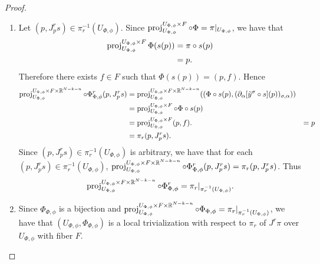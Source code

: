 \documentclass{book}
\begin{document}
\begin{proof}
\begin{enumerate}
		\item Let $(p, J_p^r s) \in \pi_r^{-1}(U_{\Phi, \phi})$. Since $\operatorname{\text{proj}}_{U_{\Phi, \phi}}^{U_{\Phi, \phi} \times F} \circ \Phi = \pi|_{U_{\Phi, \phi}}$, we have that 
		\begin{align*}
			\operatorname{\text{proj}}_{U_{\Phi, \phi}}^{U_{\Phi, \phi} \times F} \Phi(s(p))
			& = \pi \circ s(p) \\
			& = p.
		\end{align*}
		Therefore there exists $f \in F$ such that $\Phi(s(p)) = (p, f)$. Hence
		\begin{align*}
			\operatorname{\text{proj}}_{U_{\Phi, \phi}}^{U_{\Phi, \phi} \times F \times \mathbb{R}^{N-k-n}} \circ \Phi^r_{\Phi, \phi}(p, J_p^r s) 
			& = \operatorname{\text{proj}}_{U_{\Phi, \phi}}^{U_{\Phi, \phi} \times F \times \mathbb{R}^{N-k-n}}( (\Phi \circ s(p), (\partial_{\alpha}[\tilde{y}^{\sigma} \circ s](p))_{\sigma, \alpha})) \\
			& = \operatorname{\text{proj}}_{U_{\Phi, \phi}}^{U_{\Phi, \phi} \times F} \circ \Phi \circ s(p) \\
			& = \operatorname{\text{proj}}_{U_{\Phi, \phi}}^{U_{\Phi, \phi} \times F}(p, f).
			& = p \\
			& = \pi_r(p, J_p^r s).
		\end{align*}
		Since $(p, J_p^r s) \in \pi_r^{-1}(U_{\Phi, \phi})$ is arbitrary, we have that for each $(p, J_p^r s) \in \pi_r^{-1}(U_{\Phi, \phi})$, $\operatorname{\text{proj}}^{U_{\Phi, \phi} \times F \times \mathbb{R}^{N-k-n}}_{U_{\Phi, \phi}} \circ \Phi^r_{\Phi, \phi} (p, J_p^r s) = \pi_r(p, J_p^r s)$. Thus $$\operatorname{\text{proj}}_{U_{\Phi, \phi}}^{U_{\Phi, \phi} \times F \times \mathbb{R}^{N-k-n}} \circ \Phi^r_{\Phi, \phi} = \pi_r|_{\pi_r^{-1}(U_{\Phi, \phi})}.$$
		\item Since $\Phi_{\Phi, \phi}$ is a bijection and $\operatorname{\text{proj}}_{U_{\Phi, \phi}}^{U_{\Phi, \phi} \times F \times \mathbb{R}^{N-k-n}} \circ \Phi_{\Phi, \phi} = \pi_r|_{\pi_r^{-1}(U_{\Phi, \phi})}$, we have that $(U_{\Phi, \phi}, \Phi_{\Phi, \phi})$ is a local trivialization with respect to $\pi_r$ of $J^r \pi$ over $U_{\Phi, \phi}$ with fiber $F$.
	\end{enumerate}
\end{proof}
\end{document}
